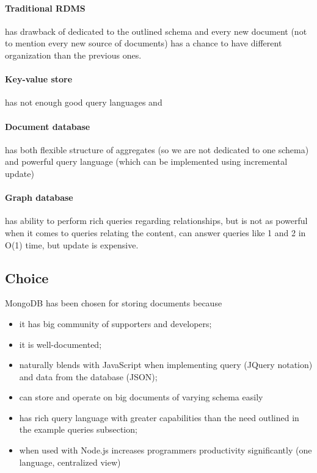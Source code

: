 \documentclass[11pt, a4paper]{report}
\begin{document}
\paragraph{Traditional RDMS} has drawback of dedicated to the outlined schema and every new document (not to mention every new source of documents) has a chance to have different organization than the previous ones.

\paragraph{Key-value store} has not enough good query languages and 

\paragraph{Document database} has both flexible structure of aggregates (so we are not dedicated to one schema) and powerful query language (which can be implemented using incremental update)

\paragraph{Graph database} has ability to perform rich queries regarding relationships, but is not as powerful when it comes to queries relating the content, can answer queries like 1 and 2 in O(1) time, but update is expensive.

\subsection{Choice}
MongoDB has been chosen for storing documents because
\begin{itemize}
  \item it has big community of supporters and developers;
  \item it is well-documented;
  \item naturally blends with JavaScript when implementing query (JQuery notation) and data from the database (JSON);
  \item can store and operate on big documents of varying schema easily
  \item has rich query language with greater capabilities than the need outlined in the example queries subsection;
  \item when used with Node.js increases programmers productivity significantly (one language, centralized view)
\end{itemize}
\end{document}
